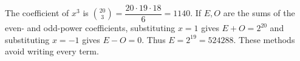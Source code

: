 The coefficient of $x^3$ is $\binom{20}{3}=\dfrac{20\cdot19\cdot18}{6}=\boxed{1140}$. If $E,O$ are the sums of the even- and odd-power coefficients, substituting $x=1$ gives $E+O=2^{20}$ and substituting $x=-1$ gives $E-O=0$. Thus $E=\boxed{2^{19}=524288}$. These methods avoid writing every term.
